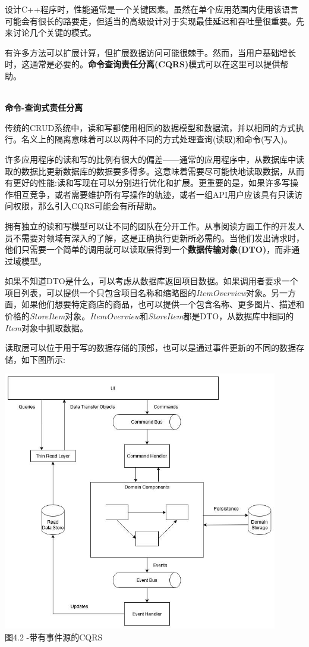 
设计C++程序时，性能通常是一个关键因素。虽然在单个应用范围内使用该语言可能会有很长的路要走，但适当的高级设计对于实现最佳延迟和吞吐量很重要。先来讨论几个关键的模式。


有许多方法可以扩展计算，但扩展数据访问可能很棘手。然而，当用户基础增长时，这通常是必要的。\textbf{命令查询责任分离(CQRS)}模式可以在这里可以提供帮助。

\hspace*{\fill} \\ %
\noindent
\textbf{命令-查询式责任分离}

传统的CRUD系统中，读和写都使用相同的数据模型和数据流，并以相同的方式执行。名义上的隔离意味着可以以两种不同的方式处理查询(读取)和命令(写入)。

许多应用程序的读和写的比例有很大的偏差——通常的应用程序中，从数据库中读取的数据比更新数据库的数据要多得多。这意味着需要尽可能快地读取数据，从而有更好的性能:读和写现在可以分别进行优化和扩展。更重要的是，如果许多写操作相互竞争，或者需要维护所有写操作的轨迹，或者一组API用户应该具有只读访问权限，那么引入CQRS可能会有所帮助。

拥有独立的读和写模型可以让不同的团队在分开工作。从事阅读方面工作的开发人员不需要对领域有深入的了解，这是正确执行更新所必需的。当他们发出请求时，他们只需要一个简单的调用就可以读取层得到一个\textbf{数据传输对象(DTO)}，而非通过域模型。

如果不知道DTO是什么，可以考虑从数据库返回项目数据。如果调用者要求一个项目列表，可以提供一个只包含项目名称和缩略图的\textit{ItemOverview}对象。另一方面，如果他们想要特定商店的商品，也可以提供一个包含名称、更多图片、描述和价格的\textit{StoreItem}对象。\textit{ItemOverview}和\textit{StoreItem}都是DTO，从数据库中相同的\textit{Item}对象中抓取数据。

读取层可以位于用于写的数据存储的顶部，也可以是通过事件更新的不同的数据存储，如下图所示:

\begin{center}
\includegraphics[width=0.9\textwidth]{content/2/chapter4/images/2.jpg}\\
图4.2 -带有事件源的CQRS
\end{center}


